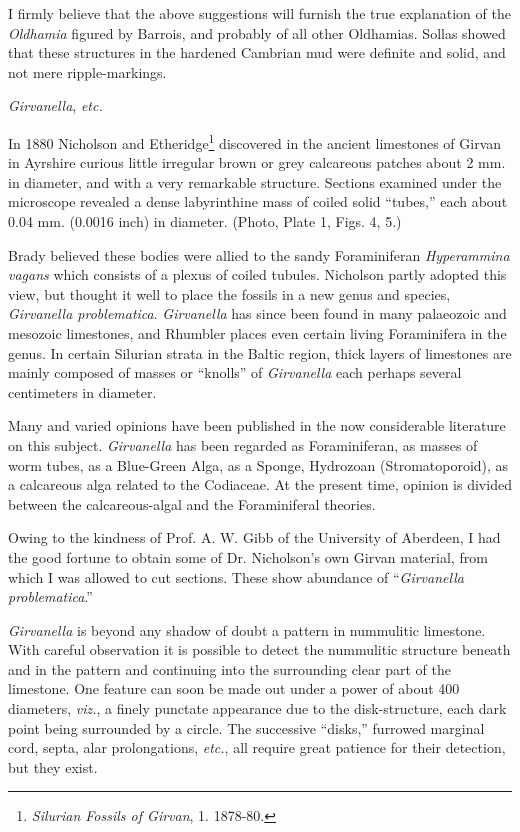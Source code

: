 \documentclass[a4paper, 12pt, oneside]{article}
\begin{document}
I firmly believe that the above suggestions will furnish the true explanation of the \emph{Oldhamia} figured by Barrois, and probably of all other Oldhamias. Sollas showed that these structures in the hardened Cambrian mud were definite and solid, and not mere ripple-markings.

\emph{Girvanella}, \emph{etc.}

In 1880 Nicholson and Etheridge\footnote{\emph{Silurian Fossils of Girvan}, 1. 1878-80.} discovered in the ancient limestones of Girvan in Ayrshire curious little irregular brown or grey calcareous patches about 2 mm. in diameter, and with a very remarkable structure. Sections examined under the microscope revealed a dense labyrinthine mass of coiled solid ``tubes,'' each about 0.04 mm. (0.0016 inch) in diameter. (Photo, Plate 1, Figs. 4, 5.)

Brady believed these bodies were allied to the sandy Foraminiferan \emph{Hyperammina vagans} which consists of a plexus of coiled tubules. Nicholson partly adopted this view, but thought it well to place the fossils in a new genus and species, \emph{Girvanella problematica}. \emph{Girvanella} has since been found in many palaeozoic and mesozoic limestones, and Rhumbler places even certain living Foraminifera in the genus. In certain Silurian strata in the Baltic region, thick layers of limestones are mainly composed of masses or ``knolls'' of \emph{Girvanella} each perhaps several centimeters in diameter.

Many and varied opinions have been published in the now considerable literature on this subject. \emph{Girvanella} has been regarded as Foraminiferan, as masses of worm tubes, as a Blue-Green Alga, as a Sponge, Hydrozoan (Stromatoporoid), as a calcareous alga related to the Codiaceae. At the present time, opinion is divided between the calcareous-algal and the Foraminiferal theories.

Owing to the kindness of Prof. A. W. Gibb of the University of Aberdeen, I had the good fortune to obtain some of Dr. Nicholson's own Girvan material, from which I was allowed to cut sections. These show abundance of ``\emph{Girvanella problematica}.''

\emph{Girvanella} is beyond any shadow of doubt a pattern in nummulitic limestone. With careful observation it is possible to detect the nummulitic structure beneath and in the pattern and continuing into the surrounding clear part of the limestone. One feature can soon be made out under a power of about 400 diameters, \emph{viz.}, a finely punctate appearance due to the disk-structure, each dark point being surrounded by a circle. The successive ``disks,'' furrowed marginal cord, septa, alar prolongations, \emph{etc.}, all require great patience for their detection, but they exist.
\end{document}
